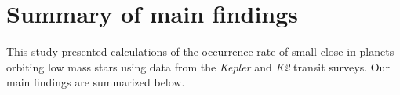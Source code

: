 \documentclass[twocolumn]{emulateapj}
\newcommand{\kepler}[1]{\emph{Kepler}#1}
\newcommand{\ktwo}[1]{\emph{K2}#1}
\begin{document}
\section{Summary of main findings} \label{sect:conclusions}
This study presented calculations of the occurrence rate of small close-in planets orbiting low mass stars
using data from the \kepler{} and \ktwo{} transit surveys. Our main findings are summarized below.
\end{document}

